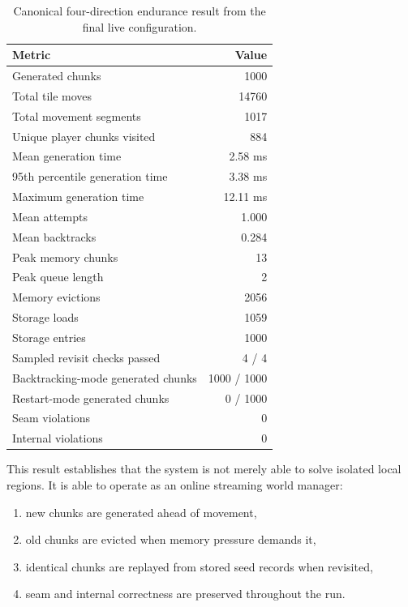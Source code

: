 \documentclass[12pt,a4paper]{report}
\begin{document}
\begin{table}[H]
\centering
\small
\begin{tabularx}{0.94\textwidth}{>{\raggedright\arraybackslash}X r}
\toprule
Metric & Value \\
\midrule
Generated chunks & 1000 \\
Total tile moves & 14760 \\
Total movement segments & 1017 \\
Unique player chunks visited & 884 \\
Mean generation time & 2.58 ms \\
95th percentile generation time & 3.38 ms \\
Maximum generation time & 12.11 ms \\
Mean attempts & 1.000 \\
Mean backtracks & 0.284 \\
Peak memory chunks & 13 \\
Peak queue length & 2 \\
Memory evictions & 2056 \\
Storage loads & 1059 \\
Storage entries & 1000 \\
Sampled revisit checks passed & 4 / 4 \\
Backtracking-mode generated chunks & 1000 / 1000 \\
Restart-mode generated chunks & 0 / 1000 \\
Seam violations & 0 \\
Internal violations & 0 \\
\bottomrule
\end{tabularx}
\caption{Canonical four-direction endurance result from the final live configuration.}
\label{tab:endurance}
\end{table}

This result establishes that the system is not merely able to solve isolated local regions. It is able to operate as an online streaming world manager:
\begin{enumerate}
\item new chunks are generated ahead of movement,
\item old chunks are evicted when memory pressure demands it,
\item identical chunks are replayed from stored seed records when revisited,
\item seam and internal correctness are preserved throughout the run.
\end{enumerate}
\end{document}
